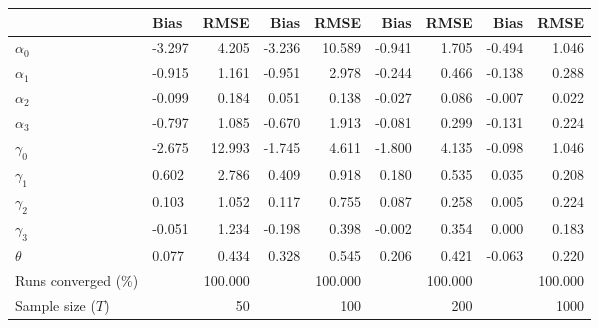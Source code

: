 
\begin{tabular}[t]{llrrrrrrr}
\toprule
  & Bias & RMSE & Bias & RMSE & Bias & RMSE & Bias & RMSE\\
\midrule
$\alpha_{0}$ & -3.297 & 4.205 & -3.236 & 10.589 & -0.941 & 1.705 & -0.494 & 1.046\\
$\alpha_{1}$ & -0.915 & 1.161 & -0.951 & 2.978 & -0.244 & 0.466 & -0.138 & 0.288\\
$\alpha_{2}$ & -0.099 & 0.184 & 0.051 & 0.138 & -0.027 & 0.086 & -0.007 & 0.022\\
$\alpha_{3}$ & -0.797 & 1.085 & -0.670 & 1.913 & -0.081 & 0.299 & -0.131 & 0.224\\
$\gamma_{0}$ & -2.675 & 12.993 & -1.745 & 4.611 & -1.800 & 4.135 & -0.098 & 1.046\\
$\gamma_{1}$ & 0.602 & 2.786 & 0.409 & 0.918 & 0.180 & 0.535 & 0.035 & 0.208\\
$\gamma_{2}$ & 0.103 & 1.052 & 0.117 & 0.755 & 0.087 & 0.258 & 0.005 & 0.224\\
$\gamma_{3}$ & -0.051 & 1.234 & -0.198 & 0.398 & -0.002 & 0.354 & 0.000 & 0.183\\
$\theta$ & 0.077 & 0.434 & 0.328 & 0.545 & 0.206 & 0.421 & -0.063 & 0.220\\
Runs converged (\%) &  & 100.000 &  & 100.000 &  & 100.000 &  & 100.000\\
Sample size ($T$) &  & 50 &  & 100 &  & 200 &  & 1000\\
\bottomrule
\end{tabular}
